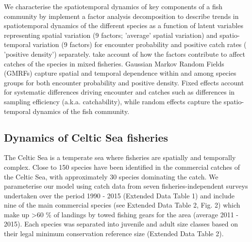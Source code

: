 \documentclass{nature}
\begin{document}
\begin{linenumbers}
 We 
characterise the spatiotemporal dynamics of key components of a fish community
by implement a factor analysis decomposition
to describe trends in spatiotemporal dynamics of the different species as a
function of latent variables\cite{Thorson2015} representing spatial variation
(9 factors; 'average' spatial variation) and
spatio-temporal variation (9 factors) for encounter probability and positive
catch rates ( 'positive density')
separately\cite{Thorson2015a}.   take account of how the factors contribute to affect
catches of the species in mixed fisheries. Gaussian Markov
Random Fields (GMRFs) capture spatial and temporal dependence
within and among species groups for both encounter probability and positive
density\cite{Thorson2013}. Fixed effects account for
systematic differences driving encounter and catches\deleted{,} such as
differences in sampling efficiency (a.k.a. catchability), while random effects
capture the spatio-temporal dynamics of the fish community.

\subsection{Dynamics of Celtic Sea fisheries} The Celtic Sea
is a temperate sea where fisheries are spatially and temporally
complex\cite{Ellis2000, Gerritsen2012}. Close to 150
species have been identified in the commercial catches of the Celtic Sea, with
approximately 30 species dominating the catch\cite{Mateo2016}. We parameterise
our model using catch data from seven
fisheries-independent surveys undertaken over the
period 1990 - 2015 (Extended Data Table 1) and include nine of the main
commercial species (see Extended Data Table 2, Fig. 2)  which make up \textgreater 60 \% of landings by towed fishing
gears for the area (average 2011 - 2015\cite{STECF2017}). Each species was
separated into juvenile and adult size classes based on their legal minimum
conservation reference size (Extended Data Table 2).


\end{linenumbers}
\end{document}
